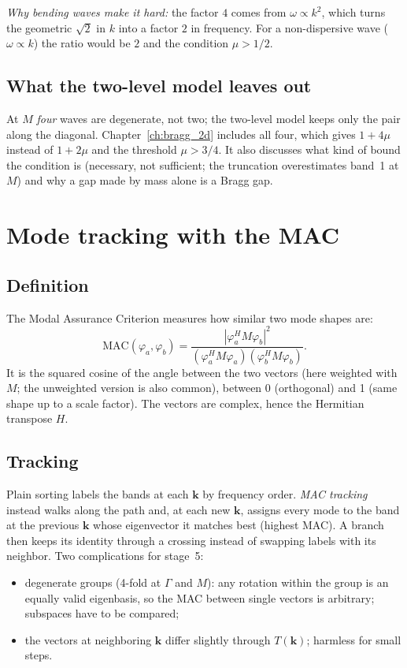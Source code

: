 \emph{Why bending waves make it hard:} the factor $4$ comes from
$\omega \propto k^2$, which turns the geometric $\sqrt{2}$ in $k$ into a factor
$2$ in frequency. For a non-dispersive wave ($\omega \propto k$) the ratio
would be $2$ and the condition $\mu > 1/2$.

\subsection{What the two-level model leaves out}
At $M$ \emph{four} waves are degenerate, not two; the two-level model keeps only
the pair along the diagonal. Chapter~\ref{ch:bragg_2d} includes all four, which
gives $1 + 4\mu$ instead of $1 + 2\mu$ and the threshold $\mu > 3/4$. It also
discusses what kind of bound the condition is (necessary, not sufficient; the
truncation overestimates band~1 at $M$) and why a gap made by mass alone is a
Bragg gap.

\section{Mode tracking with the MAC}

\subsection{Definition}
The Modal Assurance Criterion measures how similar two mode shapes are:
\begin{equation}
  \mathrm{MAC}(\varphi_a, \varphi_b) = \frac{|\varphi_a^H M \varphi_b|^2}{(\varphi_a^H M \varphi_a)(\varphi_b^H M \varphi_b)} .
\end{equation}
It is the squared cosine of the angle between the two vectors (here weighted
with $M$; the unweighted version is also common), between 0 (orthogonal) and
1 (same shape up to a scale factor). The vectors are complex, hence the
Hermitian transpose $H$.

\subsection{Tracking}
Plain sorting labels the bands at each $\mathbf{k}$ by frequency order.
\emph{MAC tracking} instead walks along the path and, at each new
$\mathbf{k}$, assigns every mode to the band at the previous $\mathbf{k}$
whose eigenvector it matches best (highest MAC). A branch then keeps its
identity through a crossing instead of swapping labels with its neighbor.
Two complications for stage~5:
\begin{itemize}
  \item degenerate groups (4-fold at $\Gamma$ and $M$): any rotation within
        the group is an equally valid eigenbasis, so the MAC between single
        vectors is arbitrary; subspaces have to be compared;
  \item the vectors at neighboring $\mathbf{k}$ differ slightly through
        $T(\mathbf{k})$; harmless for small steps.
\end{itemize}

